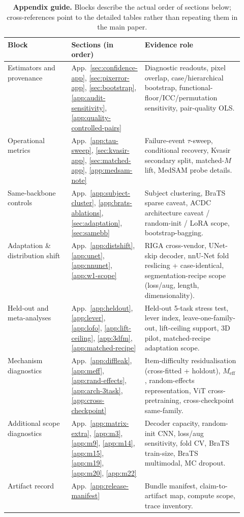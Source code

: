 \begin{table}[!htbp]
  \caption{\textbf{Appendix guide.} Blocks describe the actual order of sections
  below; cross-references point to the detailed tables rather than repeating
  them in the main paper.}
  \label{tab:appendix-guide}
  \centering\footnotesize
  \begin{tabularx}{\linewidth}{p{0.27\linewidth}p{0.27\linewidth}Y}
    \toprule
    Block & Sections (in order) & Evidence role \\
    \midrule
    Estimators and provenance &
    App.~\ref{sec:confidence-app}, \ref{sec:pixerror-app}, \ref{sec:bootstrap}, \ref{app:audit-sensitivity}, \ref{app:quality-controlled-pairs} &
    Diagnostic readouts, pixel overlap, case/hierarchical bootstrap, functional-floor/ICC/permutation sensitivity, pair-quality OLS. \\
    Operational metrics &
    App.~\ref{app:tau-sweep}, \ref{sec:kvasir-app}, \ref{sec:matched-app}, \ref{app:medsam-note} &
    Failure-event $\tau$-sweep, conditional recovery, Kvasir secondary split, matched-$M$ lift, MedSAM probe details. \\
    Same-backbone controls &
    App.~\ref{app:subject-cluster}, \ref{app:brats-ablations}, \ref{sec:adaptation}, \ref{sec:samebb} &
    Subject clustering, BraTS sparse caveat, ACDC architecture caveat / random-init / LoRA scope, bootstrap-bagging. \\
    Adaptation \& distribution shift &
    App.~\ref{app:distshift}, \ref{app:unet}, \ref{app:nnunet}, \ref{app:w1-scope} &
    RIGA cross-vendor, UNet-skip decoder, nnU-Net fold reslicing + case-identical, segmentation-recipe scope (loss/aug, length, dimensionality). \\
    Held-out and meta-analyses &
    App.~\ref{app:heldout}, \ref{app:lever}, \ref{app:lofo}, \ref{app:lift-ceiling}, \ref{app:3dfm}, \ref{app:matched-recipe} &
    Held-out 5-task stress test, lever index, leave-one-family-out, lift-ceiling support, 3D pilot, matched-recipe adaptation scope. \\
    Mechanism diagnostics &
    App.~\ref{app:diffleak}, \ref{app:meff}, \ref{app:rand-effects}, \ref{app:arch-3task}, \ref{app:cross-checkpoint} &
    Item-difficulty residualisation (cross-fitted + holdout), $M_{\mathrm{eff}}$, random-effects representation, ViT cross-pretraining, cross-checkpoint same-family. \\
    Additional scope diagnostics &
    App.~\ref{app:matrix-extra}, \ref{app:m3}, \ref{app:m9}, \ref{app:m14}, \ref{app:m15}, \ref{app:m19}, \ref{app:m20}, \ref{app:m22} &
    Decoder capacity, random-init CNN, loss/aug sensitivity, fold CV, BraTS train-size, BraTS multimodal, MC dropout. \\
    Artifact record &
    App.~\ref{app:release-manifest} &
    Bundle manifest, claim-to-artifact map, compute scope, trace inventory. \\
    \bottomrule
  \end{tabularx}
\end{table}

